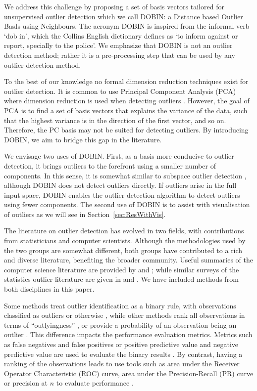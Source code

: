 \documentclass[letter,12pt]{article}
\begin{document}
We address this challenge by proposing a set of basis vectors tailored for unsupervised outlier detection which we call DOBIN: a Distance based Outlier BasIs using Neighbours. The acronym DOBIN is inspired from the informal verb `dob in', which the Collins English dictionary defines as `to inform against or report, specially to the police'. We emphasize that DOBIN is not an outlier detection method; rather it is a pre-processing step that can be used by any outlier detection method.

To the best of our knowledge no formal dimension reduction techniques exist for outlier detection. It is common to use Principal Component Analysis (PCA) where dimension reduction is used when detecting outliers \citep[e.g.,][]{talagala2019anomaly, hyndman2015large}. However, the goal of PCA is to find a set of basis vectors that explains the variance of the data, such that the highest variance is in the direction of the first vector, and so on. Therefore, the PC basis may not be suited for detecting outliers. By introducing DOBIN, we aim to bridge this gap in the literature.

We envisage two uses of DOBIN. First, as a basis more conducive to outlier detection, it brings outliers to the forefront using a smaller number of components. In this sense, it is somewhat similar to subspace outlier detection \citep[e.g.,][]{aggarwal2001outlier, keller2012hics}, although DOBIN does not detect outliers directly. If outliers arise in the full input space, DOBIN enables the outlier detection algorithm to detect outliers using fewer components. The second use of DOBIN is to assist with visualisation of outliers as we will see in Section~\ref{sec:ResWithVis}.

The literature on outlier detection has evolved in two fields, with contributions from statisticians and computer scientists. Although the methodologies used by the two groups are somewhat different, both groups have contributed to a rich and diverse literature, benefiting the broader community. Useful summaries of the computer science literature are provided by \citet{goldstein2016comparative} and \citet{zimek2012survey}; while similar surveys of the statistics outlier literature are given in \citet{rousseeuw2005} and \citet{unwin2019multivariate}. We have included methods from both disciplines in this paper.

Some methods treat outlier identification as a binary rule, with observations classified as outliers or otherwise \citep[e.g.,][]{billor2000bacon, wilkinson2017visualizing, rousseeuw2018detecting}, while other methods rank all observations in terms of ``outlyingness'' \citep[e.g.,][]{breunig2000lof, liu2008isolation}, or provide a probability of an observation being an outlier \citep[e.g.,][]{kriegel2009loop}. This difference impacts the performance evaluation metrics. Metrics such as false negatives and false positives or positive predictive value and negative predictive value are used to evaluate the binary results \citep{wilkinson2017visualizing}. By contrast, having a ranking of the observations leads to use tools such as area under the Receiver Operator Characteristic (ROC) curve, area under the Precision-Recall (PR) curve or precision at $n$ to evaluate performance \citep{campos2016evaluation}.
\end{document}
